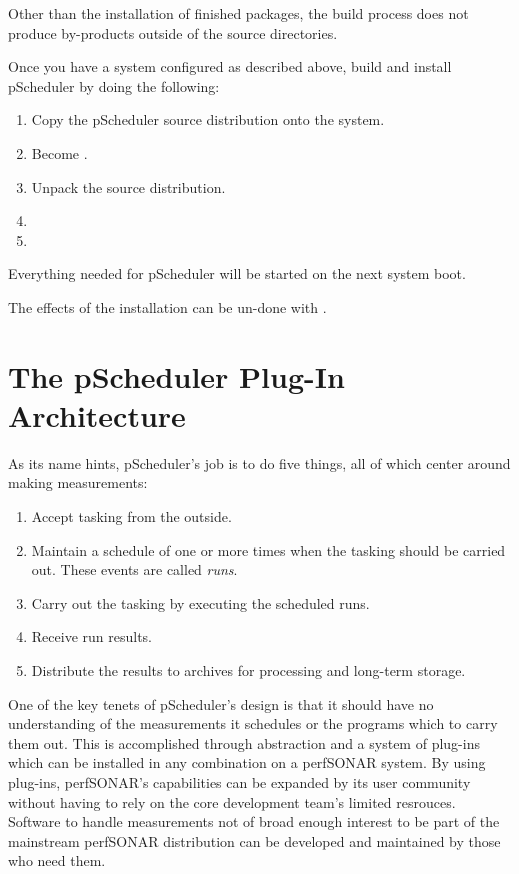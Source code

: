 \documentclass[10pt,titlepage]{article}
\begin{document}
Other than the installation of finished packages, the build process
does not produce by-products outside of the source directories.

Once you have a system configured as described above, build and
install pScheduler by doing the following:

\begin{enumerate}
\item Copy the pScheduler source distribution onto the system.
\item Become \root.
\item Unpack the source distribution.
\item {}
\item {}
\end{enumerate}

Everything needed for pScheduler will be started on the next system
boot.

The effects of the installation can be un-done with .




\part{The pScheduler Plug-In Architecture}

As its name hints, pScheduler's job is to do five things, all of which
center around making measurements:

\begin{enumerate}
\item Accept tasking from the outside.
\item Maintain a schedule of one or more times when the tasking should
  be carried out.  These events are called {\it runs}.
\item Carry out the tasking by executing the scheduled runs.
\item Receive run results.
\item Distribute the results to archives for processing and long-term
  storage.
\end{enumerate}

One of the key tenets of pScheduler's design is that it should have no
understanding of the measurements it schedules or the programs which
to carry them out.  This is accomplished through abstraction and a
system of plug-ins which can be installed in any combination on a
perfSONAR system.  By using plug-ins, perfSONAR's capabilities can be
expanded by its user community without having to rely on the core
development team's limited resrouces.  Software to handle measurements
not of broad enough interest to be part of the mainstream perfSONAR
distribution can be developed and maintained by those who need them.
\end{document}
